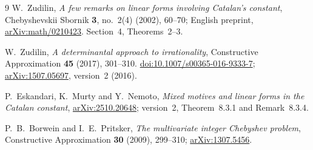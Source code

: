 \documentclass[11pt,a4paper]{article}
\theoremstyle{definition}\newtheorem{definition}[theorem]{Definition}
\theoremstyle{remark}\newtheorem{remark}[theorem]{Remark}
\begin{document}
\begin{thebibliography}{9}
W.~Zudilin, \emph{A few remarks on linear forms involving Catalan's constant}, Chebyshevskii Sbornik \textbf{3}, no.~2(4) (2002), 60--70; English preprint,
\href{https://arxiv.org/abs/math/0210423}{arXiv:math/0210423}. Section~4, Theorems~2--3.

W.~Zudilin, \emph{A determinantal approach to irrationality}, Constructive Approximation \textbf{45} (2017), 301--310.
\href{https://doi.org/10.1007/s00365-016-9333-7}{doi:10.1007/s00365-016-9333-7};
\href{https://arxiv.org/abs/1507.05697}{arXiv:1507.05697}, version~2 (2016).

P.~Eskandari, K.~Murty and Y.~Nemoto,
\emph{Mixed motives and linear forms in the Catalan constant},
\href{https://arxiv.org/abs/2510.20648}{arXiv:2510.20648}; version~2, Theorem~8.3.1 and Remark~8.3.4.

P.~B.~Borwein and I.~E.~Pritsker, \emph{The multivariate integer Chebyshev problem}, Constructive Approximation \textbf{30} (2009), 299--310;
\href{https://arxiv.org/abs/1307.5456}{arXiv:1307.5456}.
\end{thebibliography}
\end{document}
